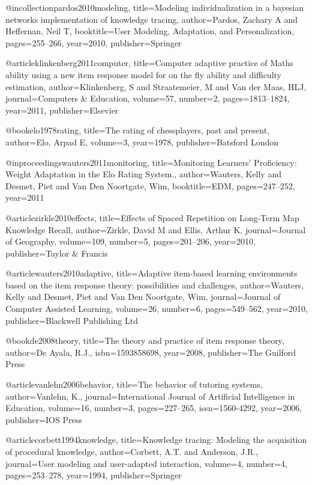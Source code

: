 @incollection{pardos2010modeling,
  title={Modeling individualization in a bayesian networks implementation of knowledge tracing},
  author={Pardos, Zachary A and Heffernan, Neil T},
  booktitle={User Modeling, Adaptation, and Personalization},
  pages={255--266},
  year={2010},
  publisher={Springer}
}

@article{klinkenberg2011computer,
  title={Computer adaptive practice of Maths ability using a new item response
                  model for on the fly ability and difficulty estimation},
  author={Klinkenberg, S and Straatemeier, M and Van der Maas, HLJ},
  journal={Computers \& Education},
  volume={57},
  number={2},
  pages={1813--1824},
  year={2011},
  publisher={Elsevier}
}

@book{elo1978rating,
  title={The rating of chessplayers, past and present},
  author={Elo, Arpad E},
  volume={3},
  year={1978},
  publisher={Batsford London}
}

@inproceedings{wauters2011monitoring,
  title={Monitoring Learners' Proficiency: Weight Adaptation in the Elo Rating System.},
  author={Wauters, Kelly and Desmet, Piet and Van Den Noortgate, Wim},
  booktitle={EDM},
  pages={247--252},
  year={2011}
}

@article{zirkle2010effects,
  title={Effects of Spaced Repetition on Long-Term Map Knowledge Recall},
  author={Zirkle, David M and Ellis, Arthur K},
  journal={Journal of Geography},
  volume={109},
  number={5},
  pages={201--206},
  year={2010},
  publisher={Taylor \& Francis}
}

@article{wauters2010adaptive,
  title={Adaptive item-based learning environments based on the item response theory: possibilities and challenges},
  author={Wauters, Kelly and Desmet, Piet and Van Den Noortgate, Wim},
  journal={Journal of Computer Assisted Learning},
  volume={26},
  number={6},
  pages={549--562},
  year={2010},
  publisher={Blackwell Publishing Ltd}
}

@book{de2008theory,
  title={{The theory and practice of item response theory}},
  author={De Ayala, R.J.},
  isbn={1593858698},
  year={2008},
  publisher={The Guilford Press}
}

@article{vanlehn2006behavior,
  title={{The behavior of tutoring systems}},
  author={Vanlehn, K.},
  journal={International Journal of Artificial Intelligence in Education},
  volume={16},
  number={3},
  pages={227--265},
  issn={1560-4292},
  year={2006},
  publisher={IOS Press}
}

@article{corbett1994knowledge,
  title={Knowledge tracing: Modeling the acquisition of procedural knowledge},
  author={Corbett, A.T. and Anderson, J.R.},
  journal={User modeling and user-adapted interaction},
  volume={4},
  number={4},
  pages={253--278},
  year={1994},
  publisher={Springer}
}


